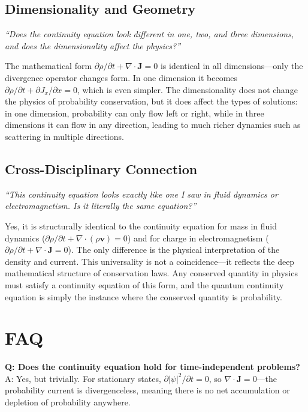 \subsection*{Dimensionality and Geometry}
\textit{``Does the continuity equation look different in one, two, and three dimensions, and does the dimensionality affect the physics?''}

The mathematical form $\partial\rho/\partial t + \nabla \cdot \mathbf{J} = 0$ is identical in all dimensions---only the divergence operator changes form. In one dimension it becomes $\partial\rho/\partial t + \partial J_x/\partial x = 0$, which is even simpler. The dimensionality does not change the physics of probability conservation, but it does affect the types of solutions: in one dimension, probability can only flow left or right, while in three dimensions it can flow in any direction, leading to much richer dynamics such as scattering in multiple directions.

\subsection*{Cross-Disciplinary Connection}
\textit{``This continuity equation looks exactly like one I saw in fluid dynamics or electromagnetism. Is it literally the same equation?''}

Yes, it is structurally identical to the continuity equation for mass in fluid dynamics ($\partial\rho/\partial t + \nabla \cdot (\rho\mathbf{v}) = 0$) and for charge in electromagnetism ($\partial\rho/\partial t + \nabla \cdot \mathbf{J} = 0$). The only difference is the physical interpretation of the density and current. This universality is not a coincidence---it reflects the deep mathematical structure of conservation laws. Any conserved quantity in physics must satisfy a continuity equation of this form, and the quantum continuity equation is simply the instance where the conserved quantity is probability.

\section*{FAQ}

\textbf{Q: Does the continuity equation hold for time-independent problems?}
A: Yes, but trivially. For stationary states, $\partial|\psi|^2/\partial t = 0$, so $\nabla \cdot \mathbf{J} = 0$---the probability current is divergenceless, meaning there is no net accumulation or depletion of probability anywhere.

